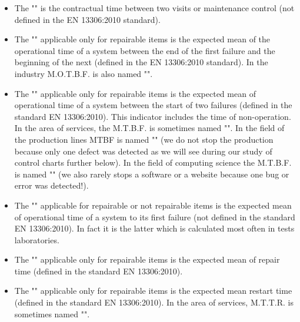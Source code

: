 	\begin{itemize}
		\item The "" is the contractual time between two visits or maintenance control (not defined in the EN 13306:2010 standard).
		
		\item The "" applicable only for repairable items is the expected mean of the operational time of a system between the end of the first failure and the beginning of the next (defined in the EN 13306:2010 standard). In the industry M.O.T.B.F. is also named "".
		
		\item The "" applicable only for repairable items is the expected mean of operational time of a system between the start of two failures (defined in the standard EN 13306:2010). This indicator includes the time of non-operation. In the area of services, the M.T.B.F. is sometimes named "". In the field of the production lines MTBF is named "" (we do not stop the production because only one defect was detected as we will see during our study of control charts further below). In the field of computing science the M.T.B.F. is named "" (we also rarely stops a software or a website because one bug or error was detected!).
		
		\item The "" applicable for repairable or not repairable items is the expected mean of operational time of a system to its first failure (not defined in the standard EN 13306:2010). In fact it is the latter which is calculated most often in tests laboratories.
		
		\item The "" applicable only for repairable items is the expected mean of repair time (defined in the standard EN 13306:2010).
		
		\item The "" applicable only for repairable items is the expected mean restart time (defined in the standard EN 13306:2010). In the area of services, M.T.T.R. is sometimes named "".
		

\end{itemize}
